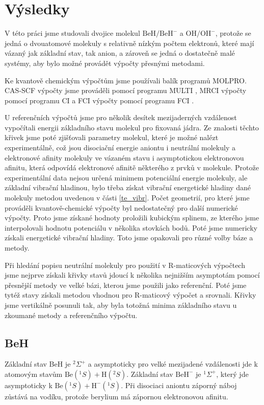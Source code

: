 \chapter{Výsledky}
V této práci jsme studovali dvojice molekul $\mathrm{BeH/BeH^-}$ a $\mathrm{OH/OH^-}$, protože se jedná o dvouatomové molekuly s relativně nízkým počtem elektronů,
které mají vázaný jak základní stav, tak anion, a zároveň se jedná o 
dostatečně malé systémy, aby bylo možné provádět výpočty přesnými metodami.

Ke kvantově chemickým výpočtům jsme používali balík programů 
MOLPRO\cite{MOLPRO-WIREs, MOLPRO}.
CAS-SCF výpočty jsme prováděli pomocí programu MULTI \cite{WK85,KW85}, MRCI výpočty 
pomocí programu CI \cite{KW92} a FCI výpočty pomocí programu FCI \cite{KH84,KH89}.

U referenčních výpočtů jsme pro několik desítek mezijaderných vzdálenost vypočítali 
energii základního stavu molekul pro fixovaná jádra. Ze znalosti těchto křivek jsme 
poté zjišťovali parametry molekul, které je 
možné nalézt experimentálně, což jsou disociační energie aniontu i neutrální molekuly 
a 
elektronové afinity molekuly  ve vázaném stavu i asymptotickou elektronovou afinitu, 
která odpovídá 
elektronové afinitě některého z prvků v molekule. Protože experimentální 
data nejsou určená minimem potenciální energie molekuly, ale základní vibrační 
hladinou, bylo třeba získat vibrační energetické hladiny dané molekuly metodou uvedenou 
v části \ref{te_vibr}. Počet geometrií, pro které jsme 
prováděli kvantově-chemické výpočty byl nedostatečný pro další numerické výpočty. Proto 
jsme získané hodnoty proložili kubickým splinem, ze kterého jsme
interpolovali hodnotu potenciálu v několika stovkách bodů. Poté jsme numericky získali 
energetické vibrační hladiny. Toto jsme opakovali pro různé volby báze a metody.

Při hledání popisu neutrální molekuly pro použití v R-maticových výpočtech jsme nejprve 
získali křivky stavů jdoucí 
k několika nejnižším asymptotám pomocí přesnější metody ve velké bázi, kterou jsme 
použili jako referenční. Poté jsme tytéž stavy získali metodou vhodnou pro R-maticový 
výpočet a srovnali. Křivky jsme vertikálně posunuli tak, aby byla 
totožná minima základního stavu u zkoumané metody a referenčního výpočtu.

\section{BeH}
Základní stav BeH je $^2\Sigma^+$ a asymptoticky pro velké mezijadené vzdálenosti jde k 
atomovým stavům $\mathrm{Be}(^1S) + \mathrm{H}(^2S)$. Základní stav $\mathrm{BeH}^-$ je 
$^1\Sigma^+$, který jde asymptoticky k $\mathrm{Be}(^1S) + \mathrm{H^-}(^1S)$.
Při disociaci aniontu záporný náboj zůstává na vodíku, protože berylium má 
zápornou elektronovou afinitu.

